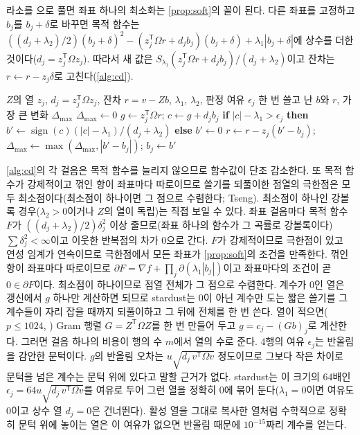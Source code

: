 라소를 으로 풀면 좌표 하나의 최소화는 \cref{prop:soft}의 꼴이 된다\cite{friedman2010}. 다른 좌표를 고정하고 $b_j$를 $b_j+\delta$로 바꾸면 목적 함수는 $((d_j+\lambda_2)/2)(b_j+\delta)^2-(z_j^{\mathsf T}\Omega r+d_jb_j)(b_j+\delta)+\lambda_1|b_j+\delta|$에 상수를 더한 것이다($d_j=z_j^{\mathsf T}\Omega z_j$). 따라서 새 값은 $S_{\lambda_1}(z_j^{\mathsf T}\Omega r+d_jb_j)/(d_j+\lambda_2)$이고 잔차는 $r\gets r-z_j\delta$로 고친다(\cref{alg:cd}).

\begin{algorithm}[htbp]
\begin{algorithmic}[1]
\Require $Z$의 열 $z_j$, $d_j=z_j^{\mathsf T}\Omega z_j$, 잔차 $r=v-Zb$, $\lambda_1$, $\lambda_2$, 판정 여유 $\epsilon_j$
\Ensure 한 번 쓸고 난 $b$와 $r$, 가장 큰 변화 $\Delta_{\max}$
\State $\Delta_{\max}\gets0$
 
  \State $g\gets z_j^{\mathsf T}\Omega r$; $c\gets g+d_jb_j$ 
  \State \textbf{if} $|c|-\lambda_1>\epsilon_j$ \textbf{then} $b'\gets\operatorname{sign}(c)(|c|-\lambda_1)/(d_j+\lambda_2)$ \textbf{else} $b'\gets0$
    \State $r\gets r-z_j(b'-b_j)$; $\Delta_{\max}\gets\max(\Delta_{\max},|b'-b_j|)$; $b_j\gets b'$
  \EndIf
\EndFor
\end{algorithmic}
\caption{라소·엘라스틱넷의 좌표 하강 한 번 쓸기 (stardust 의 )}
\label{alg:cd}
\end{algorithm}

\cref{alg:cd}의 각 걸음은 목적 함수를 늘리지 않으므로 함수값이 단조 감소한다. 또 목적 함수가 강제적이고 꺾인 항이 좌표마다 따로이므로 쓸기를 되풀이한 점열의 극한점은 모두 최소점이다(최소점이 하나이면 그 점으로 수렴한다; Tseng\cite{tseng2001}). 최소점이 하나인 강볼록 경우($\lambda_2>0$이거나 $Z$의 열이 독립)는 직접 보일 수 있다. 좌표 걸음마다 목적 함수 $F$가 $((d_j+\lambda_2)/2)\delta_j^2$ 이상 줄므로(좌표 하나의 함수가 그 곡률로 강볼록이다) $\sum\delta_j^2<\infty$이고 이웃한 반복점의 차가 $0$으로 간다. $F$가 강제적이므로 극한점이 있고 연성 임계가 연속이므로 극한점에서 모든 좌표가 \cref{prop:soft}의 조건을 만족한다. 꺾인 항이 좌표마다 따로이므로 $\partial F=\nabla f+\prod_j\partial(\lambda_1|b_j|)$이고 좌표마다의 조건이 곧 $0\in\partial F$이다. 최소점이 하나이므로 점열 전체가 그 점으로 수렴한다. 계수가 $0$인 열은 갱신에서 $g$ 하나만 계산하면 되므로 stardust는 0이 아닌 계수만 도는 짧은 쓸기를 그 계수들이 자리 잡을 때까지 되풀이하고 그 뒤에 전체를 한 번 쓴다. 열이 적으면($p\le1024$, ) Gram 행렬 $G=Z^{\mathsf T}\Omega Z$를 한 번 만들어 두고 $g=c_j-(Gb)_j$로 계산한다. 그러면 걸음 하나의 비용이 행의 수 $m$에서 열의 수로 준다. 4행의 여유 $\epsilon_j$는 반올림을 감안한 문턱이다. $g$의 반올림 오차는 $u\sqrt{d_j\,v^{\mathsf T}\Omega v}$ 정도이므로 그보다 작은 차이로 문턱을 넘은 계수는 문턱 위에 있다고 말할 근거가 없다. stardust는 이 크기의 $64$배인 $\epsilon_j=64u\sqrt{d_j\,v^{\mathsf T}\Omega v}$를 여유로 두어 그런 열을 정확히 $0$에 묶어 둔다($\lambda_1=0$이면 여유도 $0$이고 상수 열 $d_j=0$은 건너뛴다). 활성 열을 그대로 복사한 열처럼 수학적으로 정확히 문턱 위에 놓이는 열은 이 여유가 없으면 반올림 때문에 $10^{-15}$짜리 계수를 얻는다.

